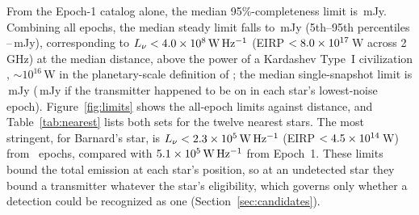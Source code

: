 \documentclass[linenumbers]{aastex702}
\newcommand{\Lnu}{L_\nu}
\newcommand{\WHz}{\mathrm{W\,Hz^{-1}}}
\begin{document}
From the Epoch-1 catalog alone, the median 95\%-completeness limit is \SlimMed\,mJy. Combining all epochs, the median steady limit falls to \SlimAllMed\,mJy (5th--95th percentiles \SlimAllLo--\SlimAllHi\,mJy), corresponding to $\Lnu<\LlimAllMed\,\WHz$ (EIRP $<8.0\times10^{17}$\,W across 2\,GHz) at the median distance, above the power of a Kardashev Type~I civilization \citep{Kardashev1964}, $\sim10^{16}$\,W in the planetary-scale definition of \citet{Gray2020}; the median single-snapshot limit is \SlimAnyMed\,mJy (\SlimBestMed\,mJy if the transmitter happened to be on in each star's lowest-noise epoch). Figure~\ref{fig:limits} shows the all-epoch limits against distance, and Table~\ref{tab:nearest} lists both sets for the twelve nearest stars. The most stringent, for Barnard's star, is $\Lnu<\BarnardLAll\,\WHz$ (EIRP $<4.5\times10^{14}$\,W) from \BarnardNep\ epochs, compared with $\BarnardL\,\WHz$ from Epoch~1. These limits bound the total emission at each star's position, so at an undetected star they bound a transmitter whatever the star's eligibility, which governs only whether a detection could be recognized as one (Section~\ref{sec:candidates}).
\end{document}
